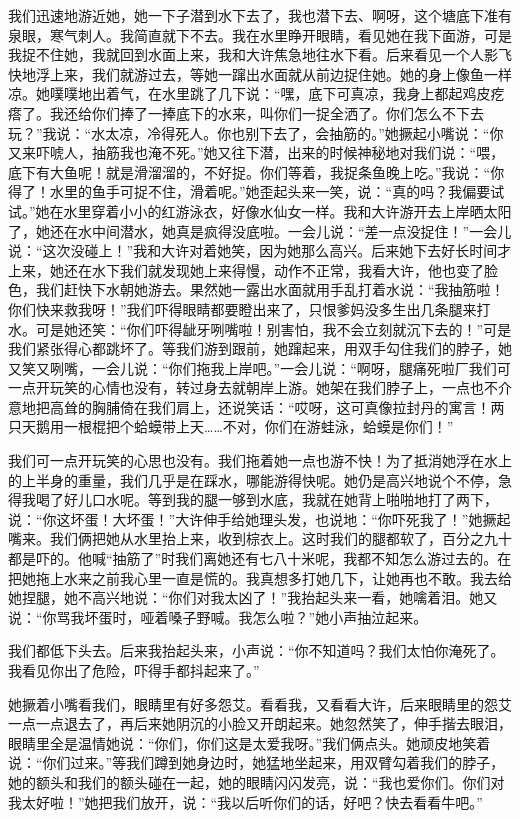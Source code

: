 我们迅速地游近她，她一下子潜到水下去了，我也潜下去、啊呀，这个塘底下准有泉眼，寒气刺人。我简直就下不去。我在水里睁开眼睛，看见她在我下面游，可是我捉不住她，我就回到水面上来，我和大许焦急地往水下看。后来看见一个人影飞快地浮上来，我们就游过去，等她一蹿出水面就从前边捉住她。她的身上像鱼一样凉。她噗噗地出着气，在水里跳了几下说：“嘿，底下可真凉，我身上都起鸡皮疙瘩了。我还给你们捧了一捧底下的水来，叫你们一捉全洒了。你们怎么不下去玩？”我说：“水太凉，冷得死人。你也别下去了，会抽筋的。”她撅起小嘴说：“你又来吓唬人，抽筋我也淹不死。”她又往下潜，出来的时候神秘地对我们说：“喂，底下有大鱼呢！就是滑溜溜的，不好捉。你们等着，我捉条鱼晚上吃。”我说：“你得了！水里的鱼手可捉不住，滑着呢。”她歪起头来一笑，说：“真的吗？我偏要试试。”她在水里穿着小小的红游泳衣，好像水仙女一样。我和大许游开去上岸晒太阳了，她还在水中间潜水，她真是疯得没底啦。一会儿说：“差一点没捉住！”一会儿说：“这次没碰上！”我和大许对着她笑，因为她那么高兴。后来她下去好长时间才上来，她还在水下我们就发现她上来得慢，动作不正常，我看大许，他也变了脸色，我们赶快下水朝她游去。果然她一露出水面就用手乱打着水说：“我抽筋啦！你们快来救我呀！”我们吓得眼睛都要瞪出来了，只恨爹妈没多生出几条腿来打水。可是她还笑：“你们吓得龇牙咧嘴啦！别害怕，我不会立刻就沉下去的！”可是我们紧张得心都跳坏了。等我们游到跟前，她蹿起来，用双手勾住我们的脖子，她又笑又咧嘴，一会儿说：“你们拖我上岸吧。”一会儿说：“啊呀，腿痛死啦厂我们可一点开玩笑的心情也没有，转过身去就朝岸上游。她架在我们脖子上，一点也不介意地把高耸的胸脯倚在我们肩上，还说笑话：“哎呀，这可真像拉封丹的寓言！两只天鹅用一根棍把个蛤蟆带上天……不对，你们在游蛙泳，蛤蟆是你们！” 

我们可一点开玩笑的心思也没有。我们拖着她一点也游不快！为了抵消她浮在水上的上半身的重量，我们几乎是在踩水，哪能游得快呢。她仍是高兴地说个不停，急得我喝了好儿口水呢。等到我的腿一够到水底，我就在她背上啪啪地打了两下，说：“你这坏蛋！大坏蛋！”大许伸手给她理头发，也说地：“你吓死我了！”她撅起嘴来。我们俩把她从水里抬上来，收到棕衣上。这时我们的腿都软了，百分之九十都是吓的。他喊“抽筋了”时我们离她还有七八十米呢，我都不知怎么游过去的。在把她拖上水来之前我心里一直是慌的。我真想多打她几下，让她再也不敢。我去给她捏腿，她不高兴地说：“你们对我太凶了！”我抬起头来一看，她噙着泪。她又说：“你骂我坏蛋时，哑着嗓子野喊。我怎么啦？”她小声抽泣起来。 

我们都低下头去。后来我抬起头来，小声说：“你不知道吗？我们太怕你淹死了。我看见你出了危险，吓得手都抖起来了。” 

她撅着小嘴看我们，眼睛里有好多怨艾。看看我，又看看大许，后来眼睛里的怨艾一点一点退去了，再后来她阴沉的小脸又开朗起来。她忽然笑了，伸手揩去眼泪，眼睛里全是温情她说：“你们，你们这是太爱我呀。”我们俩点头。她顽皮地笑着说：“你们过来。”等我们蹲到她身边时，她猛地坐起来，用双臂勾着我们的脖子，她的额头和我们的额头碰在一起，她的眼睛闪闪发亮，说：“我也爱你们。你们对我太好啦！”她把我们放开，说：“我以后听你们的话，好吧？快去看看牛吧。” 

